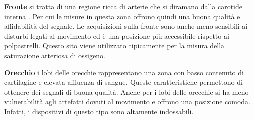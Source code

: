 	 \par \textbf{Fronte} si tratta di una regione ricca di arterie che si diramano dalla carotide interna \cite{Abay2019}. Per cui le misure in questa zona offrono quindi una buona qualità e affidabilità del segnale. Le acquisizioni sulla fronte sono anche meno sensibili ai disturbi legati al movimento ed è una posizione più accessibile rispetto ai polpastrelli. Questo sito viene utilizzato tipicamente per la misura della saturazione arteriosa di ossigeno.
 	 \par \textbf{Orecchio} i lobi delle orecchie rappresentano una zona con basso contenuto di cartilagine e elevata affluenza di sangue. Queste caratteristiche permettono di ottenere dei segnali di buona qualità. Anche per i lobi delle orecchie si ha meno vulnerabilità agli artefatti dovuti al movimento e offrono una posizione comoda. Infatti, i dispositivi di questo tipo sono altamente indossabili\cite{Ghamari2018}.

 